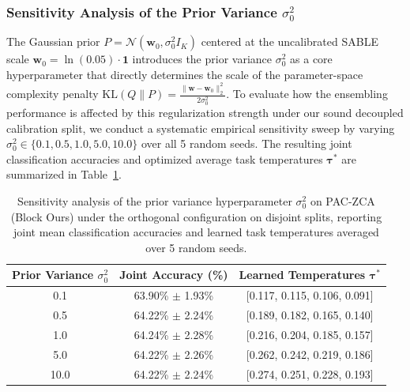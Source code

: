 \subsubsection{Sensitivity Analysis of the Prior Variance $\sigma_0^2$}
The Gaussian prior $P = \mathcal{N}(\mathbf{w}_0, \sigma_0^2 I_K)$ centered at the uncalibrated SABLE scale $\mathbf{w}_0 = \ln(0.05) \cdot \mathbf{1}$ introduces the prior variance $\sigma_0^2$ as a core hyperparameter that directly determines the scale of the parameter-space complexity penalty $\text{KL}(Q \| P) = \frac{\|\mathbf{w} - \mathbf{w}_0\|_2^2}{2 \sigma_0^2}$. To evaluate how the ensembling performance is affected by this regularization strength under our sound decoupled calibration split, we conduct a systematic empirical sensitivity sweep by varying $\sigma_0^2 \in \{0.1, 0.5, 1.0, 5.0, 10.0\}$ over all 5 random seeds. The resulting joint classification accuracies and optimized average task temperatures $\boldsymbol{\tau}^*$ are summarized in Table~\ref{tab:sensitivity_analysis}.

\begin{table}[t]
\caption{Sensitivity analysis of the prior variance hyperparameter $\sigma_0^2$ on PAC-ZCA (Block Ours) under the orthogonal configuration on disjoint splits, reporting joint mean classification accuracies and learned task temperatures averaged over 5 random seeds.}
\label{tab:sensitivity_analysis}
\centering
\small
\begin{tabular}{ccc}
\toprule
\textbf{Prior Variance $\sigma_0^2$} & \textbf{Joint Accuracy (\%)} & \textbf{Learned Temperatures $\boldsymbol{\tau}^*$} \\
\midrule
0.1 & 63.90\% $\pm$ 1.93\% & [0.117, 0.115, 0.106, 0.091] \\
0.5 & 64.22\% $\pm$ 2.24\% & [0.189, 0.182, 0.165, 0.140] \\
1.0 & 64.24\% $\pm$ 2.28\% & [0.216, 0.204, 0.185, 0.157] \\
5.0 & 64.22\% $\pm$ 2.26\% & [0.262, 0.242, 0.219, 0.186] \\
10.0 & 64.22\% $\pm$ 2.24\% & [0.274, 0.251, 0.228, 0.193] \\
\bottomrule
\end{tabular}
\end{table}

